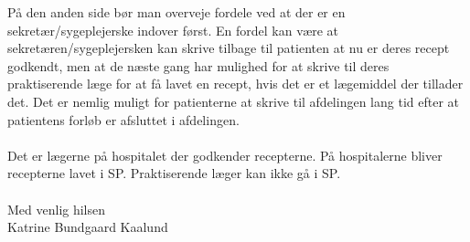 På den anden side bør man overveje fordele ved at der er en sekretær/sygeplejerske indover først. En fordel kan være at sekretæren/sygeplejersken kan skrive tilbage til patienten at nu er deres recept godkendt, men at de næste gang har mulighed for at skrive til deres praktiserende læge for at få lavet en recept, hvis det er et lægemiddel der tillader det. Det er nemlig muligt for patienterne at skrive til afdelingen lang tid efter at patientens forløb er afsluttet i afdelingen.
\\\\
Det er lægerne på hospitalet der godkender recepterne. På hospitalerne bliver recepterne lavet i SP. Praktiserende læger kan ikke gå i SP.\\\\
Med venlig hilsen\\
Katrine Bundgaard Kaalund
